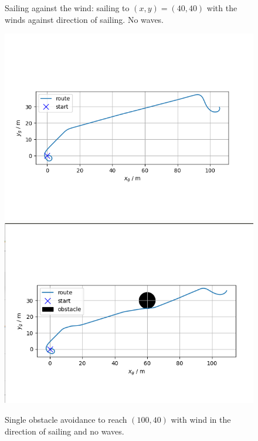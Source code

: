 \documentclass[conference]{IEEEtran}
\begin{document}
\begin{figure}
    \caption{Sailing against the wind: sailing to \((x,y)=(40,40)\) with the winds against direction of sailing. No waves.}
    \label{fig:sail_against_wind}
\end{figure}


\begin{figure}
\centering
    \includegraphics[trim={0.5cm 2cm 1.5cm 2.5cm},clip]{Figures/no-obstacle-no-waves-wind-5-10/position.png}
    \includegraphics[trim={0.5cm 2cm 1.25cm 2.5cm},clip]{Figures/Obstacles-waves-wind-4-45/obsta.png}
    \caption{Single obstacle avoidance to reach \((100, 40)\) with wind in the direction of sailing and no waves.}
    \label{fig:no_wind_one_obs}
\end{figure}
\end{document}
